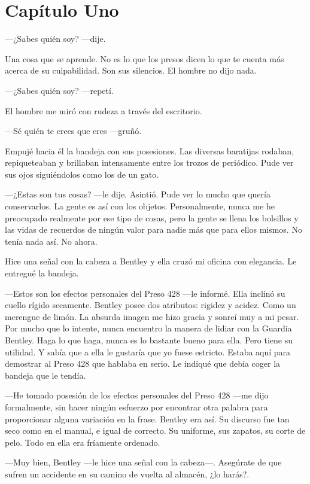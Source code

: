 \chapter*{Capítulo Uno}

---¿Sabes quién soy? ---dije.

Una cosa que se aprende. No es lo que los presos dicen lo que te cuenta
más acerca de su culpabilidad. Son sus silencios. El hombre no dijo
nada.

---¿Sabes quién soy? ---repetí.

El hombre me miró con rudeza a través del escritorio.

---Sé quién te crees que eres ---gruñó.

Empujé hacia él la bandeja con sus posesiones. Las diversas baratijas
rodaban, repiqueteaban y brillaban intensamente entre los trozos de
periódico. Pude ver sus ojos siguiéndolos como los de un gato.

---¿Estas son tus cosas? ---le dije. Asintió. Pude ver lo mucho que
quería conservarlos. La gente es así con los objetos. Personalmente,
nunca me he preocupado realmente por ese tipo de cosas, pero la gente se
llena los bolsillos y las vidas de recuerdos de ningún valor para nadie
más que para ellos mismos. No tenía nada así. No ahora.

Hice una señal con la cabeza a Bentley y ella cruzó mi oficina con
elegancia. Le entregué la bandeja.

---Estos son los efectos personales del Preso 428 ---le informé. Ella
inclinó su cuello rígido secamente. Bentley posee dos atributos: rigidez
y acidez. Como un merengue de limón. La absurda imagen me hizo gracia y
sonreí muy a mi pesar. Por mucho que lo intente, nunca encuentro la
manera de lidiar con la Guardia Bentley. Haga lo que haga, nunca es lo
bastante bueno para ella. Pero tiene su utilidad. Y sabía que a ella le
gustaría que yo fuese estricto. Estaba aquí para demostrar al Preso 428
que hablaba en serio. Le indiqué que debía coger la bandeja que le
tendía.

---He tomado posesión de los efectos personales del Preso 428 ---me dijo
formalmente, sin hacer ningún esfuerzo por encontrar otra palabra para
proporcionar alguna variación en la frase. Bentley era así. Su discurso
fue tan seco como en el manual, e igual de correcto. Su uniforme, sus
zapatos, su corte de pelo. Todo en ella era fríamente ordenado.

---Muy bien, Bentley ---le hice una señal con la cabeza---. Asegúrate de
que sufren un accidente en su camino de vuelta al almacén, ¿lo harás?.

